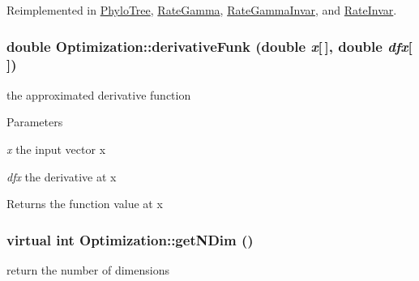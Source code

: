 Reimplemented in \hyperlink{classPhyloTree_a34c7bdc00d48d66e1a8ebfee9af1f100}{PhyloTree}, \hyperlink{classRateGamma_a24e01b7ec0d9170ceebcf03b603b2bbb}{RateGamma}, \hyperlink{classRateGammaInvar_a48fde92a023867c5d0656572f8dc0f71}{RateGammaInvar}, and \hyperlink{classRateInvar_a23d4b3aed6205e4f121a3aee43996a49}{RateInvar}.\hypertarget{classOptimization_a804d1f309afd4285d62bc48b6c00338a}{
\subsubsection[{derivativeFunk}]{\setlength{\rightskip}{0pt plus 5cm}double Optimization::derivativeFunk (double {\em x}\mbox{[}$\,$\mbox{]}, \/  double {\em dfx}\mbox{[}$\,$\mbox{]})}}
\label{classOptimization_a804d1f309afd4285d62bc48b6c00338a}
the approximated derivative function 
\begin{DoxyParams}{Parameters}
\item[{\em x}]the input vector x \item[{\em dfx}]the derivative at x \end{DoxyParams}
\begin{DoxyReturn}{Returns}
the function value at x 
\end{DoxyReturn}
\hypertarget{classOptimization_a6d04cefb0969f3cac9b607aa1412eb57}{
\subsubsection[{getNDim}]{\setlength{\rightskip}{0pt plus 5cm}virtual int Optimization::getNDim ()}}
\label{classOptimization_a6d04cefb0969f3cac9b607aa1412eb57}
return the number of dimensions 


